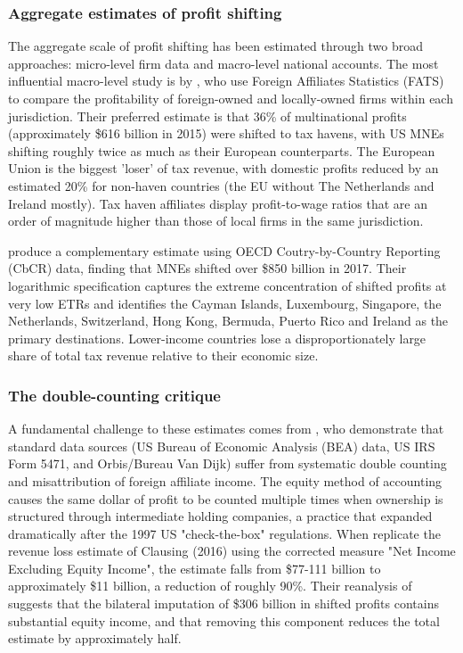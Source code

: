 \documentclass[11pt,a4paper]{article}
\begin{document}
\subsubsection{Aggregate estimates of profit shifting}

The aggregate scale of profit shifting has been estimated through two broad approaches: micro-level firm data and macro-level national accounts. The most influential macro-level study is by \citet{torslov2022}, who use Foreign Affiliates Statistics (FATS) to compare the profitability of foreign-owned and locally-owned firms within each jurisdiction. Their preferred estimate is that 36\% of multinational profits (approximately \$616 billion in 2015) were shifted to tax havens, with US MNEs shifting roughly twice as much as their European counterparts. The European Union is the biggest 'loser' of tax revenue, with domestic profits reduced by an estimated 20\% for non-haven countries (the EU without The Netherlands and Ireland mostly). Tax haven affiliates display profit-to-wage ratios that are an order of magnitude higher than those of local firms in the same jurisdiction.

\citet{garcia2024} produce a complementary estimate using OECD Coutry-by-Country Reporting (CbCR) data, finding that MNEs shifted over \$850 billion in 2017. Their logarithmic specification captures the extreme concentration of shifted profits at very low ETRs and identifies the Cayman Islands, Luxembourg, Singapore, the Netherlands, Switzerland, Hong Kong, Bermuda, Puerto Rico and Ireland as the primary destinations. Lower-income countries lose a disproportionately large share of total tax revenue relative to their economic size.

\subsubsection{The double-counting critique}

A fundamental challenge to these estimates comes from \citet{blouin2023}, who demonstrate that standard data sources (US Bureau of Economic Analysis (BEA) data, US IRS Form 5471, and Orbis/Bureau Van Dijk) suffer from systematic double counting and misattribution of foreign affiliate income. The equity method of accounting causes the same dollar of profit to be counted multiple times when ownership is structured through intermediate holding companies, a practice that expanded dramatically after the 1997 US "check-the-box" regulations. When \citet{blouin2023} replicate the revenue loss estimate of Clausing (2016) using the corrected measure "Net Income Excluding Equity Income", the estimate falls from \$77-111 billion to approximately \$11 billion, a reduction of roughly 90\%. Their reanalysis of \citet{torslov2022} suggests that the bilateral imputation of \$306 billion in shifted profits contains substantial equity income, and that removing this component reduces the total estimate by approximately half.
\end{document}
